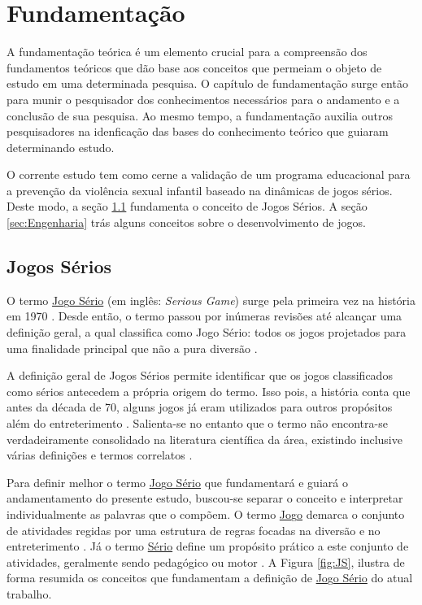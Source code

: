 \chapter{Fundamentação}\label{ch:Fundamentacao}

A fundamentação teórica é um elemento crucial para a compreensão dos fundamentos teóricos que dão base aos conceitos que permeiam o objeto de estudo em uma determinada pesquisa. O capítulo de fundamentação surge então para munir o pesquisador dos conhecimentos necessários para o andamento e a conclusão de sua pesquisa. Ao mesmo tempo, a fundamentação auxilia outros pesquisadores na idenficação das bases do conhecimento teórico que guiaram determinando estudo. 

O corrente estudo tem como cerne a validação de um programa educacional para a prevenção da violência sexual infantil baseado na dinâmicas de jogos sérios. Deste modo, a seção \ref{sec:JogosSerios} fundamenta o conceito de Jogos Sérios. A seção \ref{sec:Engenharia} trás alguns conceitos sobre o desenvolvimento de jogos. %

\vspace{0.75cm}

\section{Jogos Sérios}\label{sec:JogosSerios}

O termo \underline{Jo}g\underline{o Sério} (em inglês: \textit{Serious Game}) surge pela primeira vez na história em 1970 \cite{clark1970serious}. Desde então, o termo passou por inúmeras revisões até alcançar uma definição geral, a qual classifica como Jogo Sério: todos os jogos projetados para uma finalidade principal que não a pura diversão \cite{michael2005serious, de2015aprendizagem, laamarti2014overview}.

A definição geral de Jogos Sérios permite identificar que os jogos classificados como sérios antecedem a própria origem do termo. Isso pois, a história conta que antes da década de 70, alguns jogos já eram utilizados para outros propósitos além do entreterimento \cite{wilkinson2016brief}. Salienta-se no entanto que o termo não encontra-se verdadeiramente consolidado na literatura científica da área, existindo inclusive várias definições e termos correlatos \cite{pourabdollahian2012serious}.

Para definir melhor o termo \underline{Jo}g\underline{o Sério} que fundamentará e guiará o andamentamento do presente estudo, buscou-se separar o conceito e interpretar individualmente as palavras que o compõem. O termo \underline{Jo}g\underline{o} demarca o conjunto de atividades regidas por uma estrutura de regras focadas na diversão e no entreterimento \cite{kishimoto1994jogo}. Já o termo \underline{Sério} define um propósito prático a este conjunto de atividades, geralmente sendo pedagógico ou motor \cite{schroeder2017wobu, baptista2017jogos}. %
A Figura \ref{fig:JS}, ilustra de forma resumida os conceitos que fundamentam a definição de \underline{Jo}g\underline{o Sério} do atual trabalho.  

